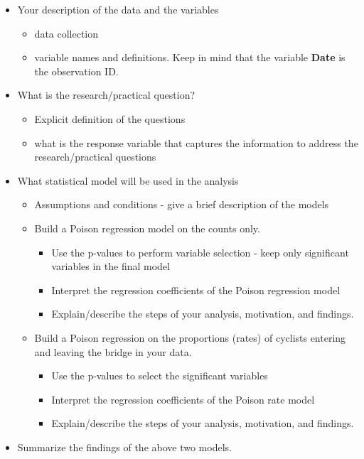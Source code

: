 \documentclass[
]{book}
\providecommand{\tightlist}{%
  \setlength{\itemsep}{0pt}\setlength{\parskip}{0pt}}
\begin{document}
\begin{itemize}
\tightlist
\item
  Your description of the data and the variables

  \begin{itemize}
  \tightlist
  \item
    data collection
  \item
    variable names and definitions. Keep in mind that the variable \textbf{Date} is the observation ID.
  \end{itemize}
\item
  What is the research/practical question?

  \begin{itemize}
  \tightlist
  \item
    Explicit definition of the questions
  \item
    what is the response variable that captures the information to address the research/practical questions
  \end{itemize}
\item
  What statistical model will be used in the analysis

  \begin{itemize}
  \tightlist
  \item
    Assumptions and conditions - give a brief description of the models
  \item
    Build a Poison regression model on the counts only.

    \begin{itemize}
    \tightlist
    \item
      Use the p-values to perform variable selection - keep only significant variables in the final model
    \item
      Interpret the regression coefficients of the Poison regression model
    \item
      Explain/describe the steps of your analysis, motivation, and findings.
    \end{itemize}
  \item
    Build a Poison regression on the proportions (rates) of cyclists entering and leaving the bridge in your data.

    \begin{itemize}
    \tightlist
    \item
      Use the p-values to select the significant variables
    \item
      Interpret the regression coefficients of the Poison rate model
    \item
      Explain/describe the steps of your analysis, motivation, and findings.
    \end{itemize}
  \end{itemize}
\item
  Summarize the findings of the above two models.
\end{itemize}
\end{document}
